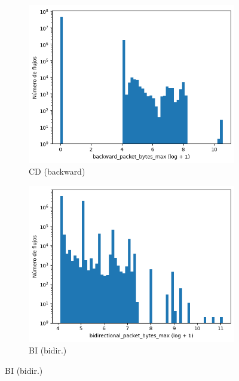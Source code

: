 \begin{figure}[H]
\begin{subfigure}[b]{0.26\textwidth}
        \includegraphics[width=\textwidth]{media/packet_pincer_cicddos/backward_packet_bytes_max_log_x_log_y.png}
        \caption{CD (backward)}
    \end{subfigure}
    \hfill
    \begin{subfigure}[b]{0.26\textwidth}
        \centering
        \includegraphics[width=\linewidth]{media/packet_pincer_botiot/bidirectional_packet_bytes_max_log_x_log_y.png}
        \caption{BI (bidir.)}

\end{subfigure}
\end{figure}
